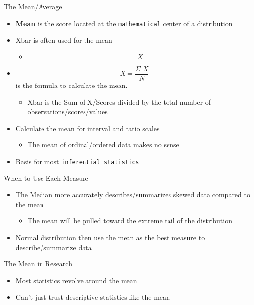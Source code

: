 \documentclass[
  ignorenonframetext,
]{beamer}
\providecommand{\tightlist}{%
  \setlength{\itemsep}{0pt}\setlength{\parskip}{0pt}}\usepackage{longtable,booktabs,array}
\begin{document}
\begin{frame}[fragile]{The Mean/Average}
\label{the-meanaverage}
\begin{itemize}
\item
  \textbf{Mean} is the score located at the \texttt{mathematical} center
  of a distribution
\item
  Xbar is often used for the mean

  \begin{itemize}
  \tightlist
  \item
    \[ \overline{X} \]
  \end{itemize}
\item
  \[\overline{X} = \frac{\Sigma\;X}{N} \] is the formula to calculate
  the mean.

  \begin{itemize}
  \tightlist
  \item
    Xbar is the Sum of X/Scores divided by the total number of
    observations/scores/values
  \end{itemize}
\item
  Calculate the mean for interval and ratio scales

  \begin{itemize}
  \tightlist
  \item
    The mean of ordinal/ordered data makes no sense
  \end{itemize}
\item
  Basis for most \texttt{inferential\ statistics}
\end{itemize}
\end{frame}

\begin{frame}{When to Use Each Measure}
\label{when-to-use-each-measure}
\begin{itemize}
\tightlist
\item
  The Median more accurately describes/summarizes skewed data compared
  to the mean

  \begin{itemize}
  \tightlist
  \item
    The mean will be pulled toward the extreme tail of the distribution
  \end{itemize}
\item
  Normal distribution then use the mean as the best measure to
  describe/summarize data
\end{itemize}
\end{frame}

\begin{frame}{The Mean in Research}
\label{the-mean-in-research}
\begin{itemize}
\item
  Most statistics revolve around the mean
\item
  Can't just trust descriptive statistics like the mean
\end{itemize}
\end{frame}
\end{document}
